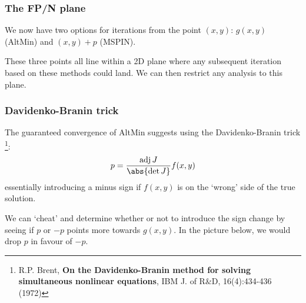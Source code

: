 \documentclass{beamer}
\DeclareMathOperator{\adj}{adj}
\begin{document}
\begin{frame}
\frametitle{The FP/N plane}

We now have two options for iterations from the point $(x,y)$:
$g(x,y)$ (AltMin) and $(x,y) + p$ (MSPIN).

These three points all line within a 2D plane where any subsequent iteration based on these methods could land.
We can then restrict any analysis to this plane.

		\begin{figure}
		\end{figure}
\end{frame}

\begin{frame}
\frametitle{Davidenko-Branin trick}

The guaranteed convergence of AltMin suggests using the Davidenko-Branin trick \footnote{R.P. Brent, \textbf{On the Davidenko-Branin method for solving simultaneous nonlinear equations}, IBM J. of R\&D, 16(4):434-436 (1972)}: 
\begin{equation*}
	p = \frac{ \adj J}{\abs{ \det J}} f(x,y)
\end{equation*}
essentially introducing a minus sign if $f(x,y)$ is on the `wrong' side of the true solution.

We can `cheat' and determine whether or not to introduce the sign change by seeing if $p$ or $-p$ points more towards $g(x,y)$.
In the picture below, we would drop $p$ in favour of $-p$.

\begin{figure}
\end{figure}

\end{frame}
\end{document}
